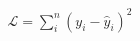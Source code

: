 \documentclass[preview]{standalone}
\begin{document}
\begin{align*}
\mathcal{L} = \sum_i^n (y_i-\hat{y}_i)^2
\end{align*}
\end{document}
